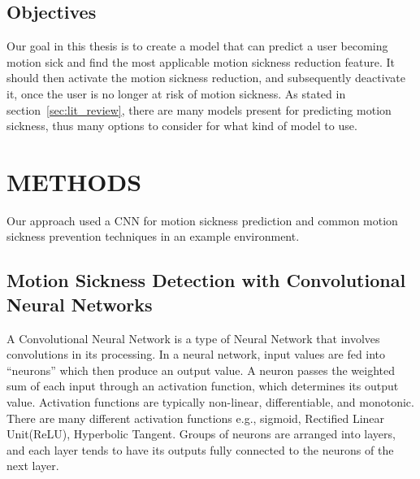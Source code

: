 \section{Objectives}
\label{sec:objectives}

Our goal in this thesis is to create a model that can predict a user becoming motion sick and find the most applicable motion sickness reduction feature.
It should then activate the motion sickness reduction, and subsequently deactivate it, once the user is no longer at risk of motion sickness.
As stated in section~\ref{sec:lit_review}, there are many models present for predicting motion sickness, thus many options to consider for what kind of model to use.

\chapter{METHODS}
\label{ch:methods}

Our approach used a CNN for motion sickness prediction and common motion sickness prevention techniques in an example environment.

\section{Motion Sickness Detection with Convolutional Neural Networks}
\label{sec:detection}

A Convolutional Neural Network is a type of Neural Network that involves convolutions in its processing.
In a neural network, input values are fed into ``neurons'' which then produce an output value.
A neuron passes the weighted sum of each input through an activation function, which determines its output value.
Activation functions are typically non-linear, differentiable, and monotonic.
There are many different activation functions e.g., sigmoid, Rectified Linear Unit(ReLU), Hyperbolic Tangent.
Groups of neurons are arranged into layers, and each layer tends to have its outputs fully connected to the neurons of the next layer.

